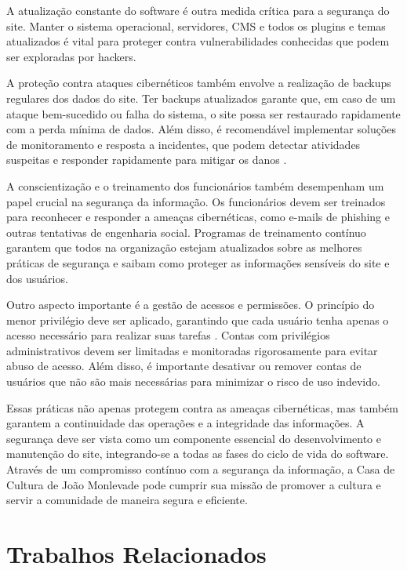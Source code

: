 A atualização constante do software é outra medida crítica para a segurança do site. Manter o sistema operacional, servidores, \ac{CMS} e todos os plugins e temas atualizados é vital para proteger contra vulnerabilidades conhecidas que podem ser exploradas por hackers. 

A proteção contra ataques cibernéticos também envolve a realização de backups regulares dos dados do site. Ter backups atualizados garante que, em caso de um ataque bem-sucedido ou falha do sistema, o site possa ser restaurado rapidamente com a perda mínima de dados. Além disso, é recomendável implementar soluções de monitoramento e resposta a incidentes, que podem detectar atividades suspeitas e responder rapidamente para mitigar os danos \cite{baykara2018overview}.

A conscientização e o treinamento dos funcionários também desempenham um papel crucial na segurança da informação. Os funcionários devem ser treinados para reconhecer e responder a ameaças cibernéticas, como e-mails de phishing e outras tentativas de engenharia social. Programas de treinamento contínuo garantem que todos na organização estejam atualizados sobre as melhores práticas de segurança e saibam como proteger as informações sensíveis do site e dos usuários.

Outro aspecto importante é a gestão de acessos e permissões. O princípio do menor privilégio deve ser aplicado, garantindo que cada usuário tenha apenas o acesso necessário para realizar suas tarefas \cite{schneider2003least}. Contas com privilégios administrativos devem ser limitadas e monitoradas rigorosamente para evitar abuso de acesso. Além disso, é importante desativar ou remover contas de usuários que não são mais necessárias para minimizar o risco de uso indevido.

Essas práticas não apenas protegem contra as ameaças cibernéticas, mas também garantem a continuidade das operações e a integridade das informações. A segurança deve ser vista como um componente essencial do desenvolvimento e manutenção do site, integrando-se a todas as fases do ciclo de vida do software. Através de um compromisso contínuo com a segurança da informação, a Casa de Cultura de João Monlevade pode cumprir sua missão de promover a cultura e servir a comunidade de maneira segura e eficiente.

\section{Trabalhos Relacionados}

